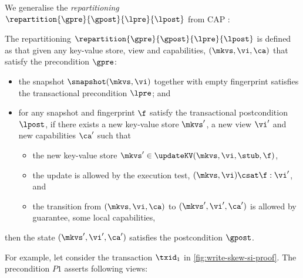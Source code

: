 We generalise the \emph{repartitioning} \( \repartition{\gpre}{\gpost}{\lpre}{\lpost} \) from CAP \cite{cap}:
\begin{definition}[Repartitioning]
The repartitioning  \( \repartition{\gpre}{\gpost}{\lpre}{\lpost} \) is defined as that 
given any key-value store, view and capabilities, \( (\mkvs, \vi, \ca) \) that satisfy the precondition \( \gpre \):
\begin{itemize}
    \item the snapshot \( \snapshot(\mkvs,\vi) \) together with empty fingerprint satisfies the transactional precondition \( \lpre \); and
    \item for any snapshot and fingerprint \( \f \) satisfy the transactional postcondition \( \lpost \), if
        there exists a new key-value store \( \mkvs' \), a new view \( \vi' \) and new capabilities \( \ca' \) such that 
    \begin{itemize}
        \item the new key-value store \( \mkvs' \in \updateKV(\mkvs, \vi, \stub, \f) \),
        \item the update is allowed by the execution test, \ie \( (\mkvs, \vi) \csat \f : \vi' \), and
        \item the transition from \( (\mkvs, \vi, \ca) \) to \( (\mkvs', \vi', \ca') \) is allowed by guarantee, \ie some local capabilities,
    \end{itemize} 
\end{itemize}
then the state \( (\mkvs', \vi', \ca') \) satisfies the postcondition \( \gpost \).
\end{definition}

For example,  let consider the transaction \( \txid_1 \) in \cref{fig:write-skew-si-proof}.
The precondition \( P1 \) asserts following views:


